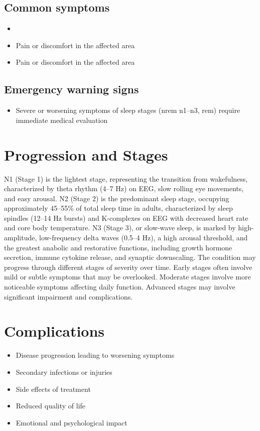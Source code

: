 \subsection{Common symptoms}
\begin{itemize}[noitemsep]
  \item \item Pain or discomfort in the affected area    \item Pain or discomfort in the affected area
  \end{itemize}

\subsection{Emergency warning signs}
\begin{itemize}[noitemsep]
  \item Severe or worsening symptoms of sleep stages (nrem n1--n3, rem) require immediate medical evaluation
\end{itemize}
\section{Progression and Stages}
N1 (Stage 1) is the lightest stage, representing the transition from wakefulness, characterized by theta rhythm (4--7 Hz) on EEG, slow rolling eye movements, and easy arousal. N2 (Stage 2) is the predominant sleep stage, occupying approximately 45--55\% of total sleep time in adults, characterized by sleep spindles (12--14 Hz bursts) and K-complexes on EEG with decreased heart rate and core body temperature. N3 (Stage 3), or slow-wave sleep, is marked by high-amplitude, low-frequency delta waves (0.5--4 Hz), a high arousal threshold, and the greatest anabolic and restorative functions, including growth hormone secretion, immune cytokine release, and synaptic downscaling. The condition may progress through different stages of severity over time. Early stages often involve mild or subtle symptoms that may be overlooked. Moderate stages involve more noticeable symptoms affecting daily function. Advanced stages may involve significant impairment and complications.
\section{Complications}
\begin{itemize}[noitemsep]
  \item Disease progression leading to worsening symptoms
  \item Secondary infections or injuries
  \item Side effects of treatment
  \item Reduced quality of life
  \item Emotional and psychological impact
\end{itemize}
